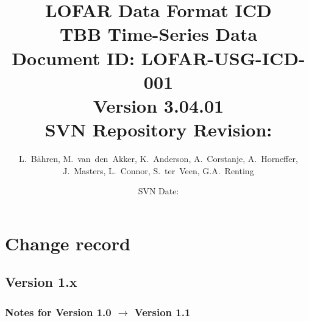 \documentclass[a4paper,10pt,bibtotoc]{scrartcl}
\begin{document}
\title{LOFAR Data Format ICD \\ TBB Time-Series Data \\
  {\normalsize Document ID: LOFAR-USG-ICD-001} \\
  {\normalsize Version 3.04.01} \\
  {\normalsize SVN Repository Revision: \svnInfoMaxRevision}}
\author{ \parbox{\linewidth}{\centering L.~B\"ahren,  M.~van~den~Akker, K.~Anderson, A.~Corstanje, A.~Horneffer, J.~Masters, L.~Connor, S.~ter~Veen, G.A.~Renting } }
\date{\small{SVN Date: \svnInfoMaxToday}}

\maketitle

\tableofcontents

\listoffigures

\listoftables

\clearpage



\section*{Change record}


\subsection{Version 1.x}

\subsubsection*{Notes for Version 1.0 $\rightarrow$ Version 1.1}
\end{document}
